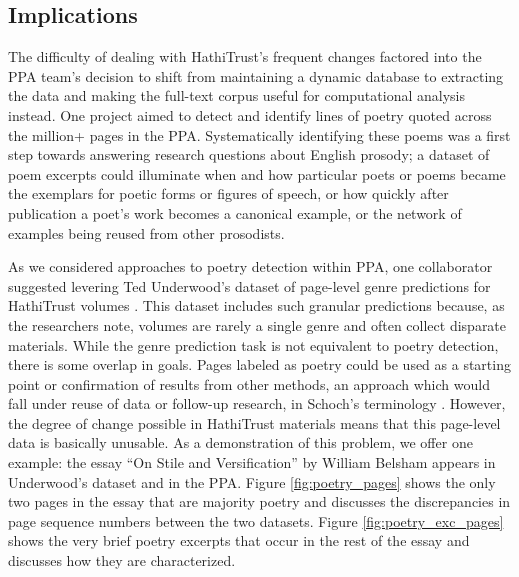\documentclass[final]{anthology-ch} %
\begin{document}
\subsection{Implications}

The difficulty of dealing with HathiTrust's frequent changes factored into the PPA team's decision to shift from maintaining a dynamic database to extracting the data and making the full-text corpus useful for computational analysis instead. One project aimed to detect and identify lines of poetry quoted across the million+ pages in the PPA. Systematically identifying these poems was a first step towards answering research questions about English prosody; a dataset of poem excerpts could illuminate when and how particular poets or poems became the exemplars for poetic forms or figures of speech, or how quickly after publication a poet’s work becomes a canonical example, or the network of examples being reused from other prosodists.

As we considered approaches to poetry detection within PPA, one collaborator suggested levering  Ted Underwood's dataset of page-level genre predictions for HathiTrust volumes \cite{underwood_page-level_2014}. This dataset includes such granular predictions because, as the researchers note, volumes are rarely a single genre and often collect disparate materials. While the genre prediction task is not equivalent to poetry detection, there is some overlap in goals. Pages labeled as poetry could be used as a starting point or confirmation of results from other methods, an approach which would fall under reuse of data or follow-up research, in Schoch's terminology \autocite{schoch_repetitive_2023}. However, the degree of change possible in HathiTrust materials means that this page-level data is basically unusable. As a demonstration of this problem, we offer one example: the essay ``On Stile and Versification'' by William Belsham \cite{belsham_stile_1799} appears in Underwood's dataset and in the PPA. Figure \ref{fig:poetry_pages} shows the only two pages in the essay that are majority poetry and discusses the discrepancies in page sequence numbers between the two datasets. Figure \ref{fig:poetry_exc_pages} shows the very brief poetry excerpts that occur in the rest of the essay and discusses how they are characterized.
\end{document}
